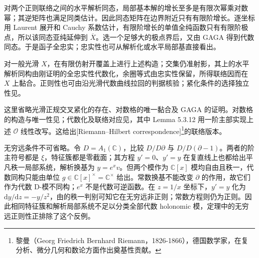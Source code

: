 \begin{proofsketch}
	对两个正则联络之间的水平解析同态，局部基本解的增长至多是有限次幂乘对数幂；其逆矩阵也满足同类估计。因此同态矩阵在边界附近只有有限阶增长。逐坐标用 Laurent 展开和 Cauchy 系数估计，有限阶增长的单值全纯函数只有有限阶极点，所以该同态亚纯延伸到 \(\overline X\)。选一个足够大的极点界后，又由 GAGA 得到代数同态。于是函子全忠实；忠实性也可从解析化或水平局部基直接看出。

	对一般光滑 \(X\)，在有限仿射开覆盖上进行上述构造；交集仍准射影，其上的水平解析同构由刚证明的全忠实性代数化，余圈等式由忠实性保留，所得联络因而在 \(X\) 上黏合。正则性也可由沿光滑代数曲线拉回的判据核验；紧化条件的选择独立性见\cite[Proposition 5.3.6 and Theorem 5.3.7, pp. 154--155]{HottaTakeuchiTanisaki2008DModules}。

	这里省略光滑正规交叉紧化的存在、对数格的唯一黏合及 GAGA 的证明。对数格的构造与唯一性见\cite[Theorem 5.2.17, pp. 145--147]{HottaTakeuchiTanisaki2008DModules}；代数化及联络对应见\cite[Theorem 5.3.8, Corollary 5.3.10 and Lemma 5.3.12, pp. 155--159]{HottaTakeuchiTanisaki2008DModules}，其中 Lemma 5.3.12 用一阶主部实现上述 \(\mathcal O\) 线性改写。这给出[Riemann--Hilbert correspondence]\footnote{黎曼（Georg Friedrich Bernhard Riemann，1826-1866），德国数学家，在复分析、微分几何和数论方面作出奠基性贡献。}的联络版本。
\end{proofsketch}

无穷远条件不可省略。令 \(D=A_1(\mathbb C)\)，比较 \(D/D\partial\) 与 \(D/D(\partial-1)\)。两者的阶主符号都是 \(\xi\)，特征簇都是零截面；其方程 \(y'=0\)、\(y'=y\) 在复直线上也都给出平凡秩一局部系统，解析换基为 \(y=e^xv\)。但两个模作为 \(\mathbb C[x]\) 模均自由且秩一，代数同构只能由单位 \(g\in\mathbb C[x]^\times=\mathbb C^\times\) 给出。常数换基不能改变 \(\partial\) 的作用，故它们作为代数 D-模不同构；\(e^x\) 不是代数可逆函数。在 \(z=1/x\) 坐标下，\(y'=y\) 化为 \(\mathrm{d}y/\mathrm{d}z=-y/z^2\)，由的秩一判别可知它在无穷远非正则；常数方程则仍为正则。因此相同特征簇和解析局部系统不足以分类全部代数 holonomic 模，定理中的无穷远正则性正排除了这个反例。

